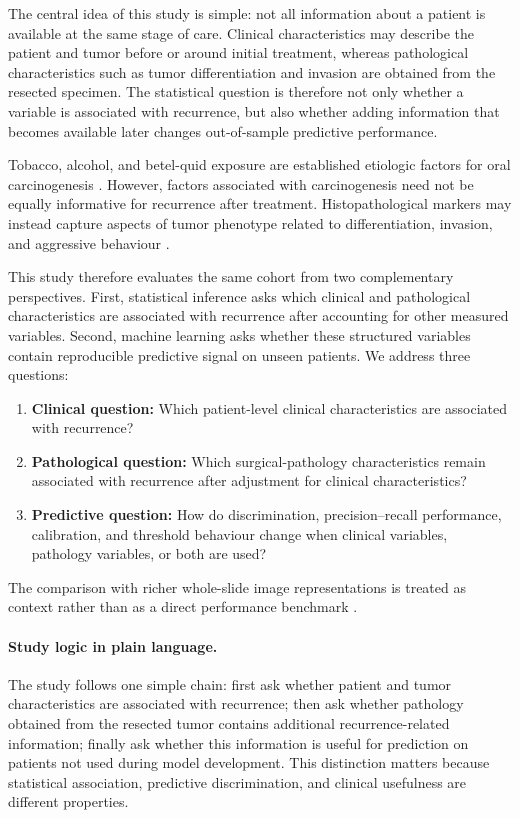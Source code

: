 \documentclass[11pt,a4paper]{article}
\begin{document}
The central idea of this study is simple: not all information about a patient is available at the same stage of care. Clinical characteristics may describe the patient and tumor before or around initial treatment, whereas pathological characteristics such as tumor differentiation and invasion are obtained from the resected specimen. The statistical question is therefore not only whether a variable is associated with recurrence, but also whether adding information that becomes available later changes out-of-sample predictive performance.

Tobacco, alcohol, and betel-quid exposure are established etiologic factors for oral carcinogenesis \cite{sung_global_2021}. However, factors associated with carcinogenesis need not be equally informative for recurrence after treatment. Histopathological markers may instead capture aspects of tumor phenotype related to differentiation, invasion, and aggressive behaviour \cite{almangush_staging_2020}.

This study therefore evaluates the same cohort from two complementary perspectives. First, statistical inference asks which clinical and pathological characteristics are associated with recurrence after accounting for other measured variables. Second, machine learning asks whether these structured variables contain reproducible predictive signal on unseen patients. We address three questions:
\begin{enumerate}
    \item \textbf{Clinical question:} Which patient-level clinical characteristics are associated with recurrence?
    \item \textbf{Pathological question:} Which surgical-pathology characteristics remain associated with recurrence after adjustment for clinical characteristics?
    \item \textbf{Predictive question:} How do discrimination, precision--recall performance, calibration, and threshold behaviour change when clinical variables, pathology variables, or both are used?
\end{enumerate}
The comparison with richer whole-slide image representations is treated as context rather than as a direct performance benchmark \cite{guan2026multi}.

\paragraph{Study logic in plain language.} The study follows one simple chain: first ask whether patient and tumor characteristics are associated with recurrence; then ask whether pathology obtained from the resected tumor contains additional recurrence-related information; finally ask whether this information is useful for prediction on patients not used during model development. This distinction matters because statistical association, predictive discrimination, and clinical usefulness are different properties.
\end{document}
